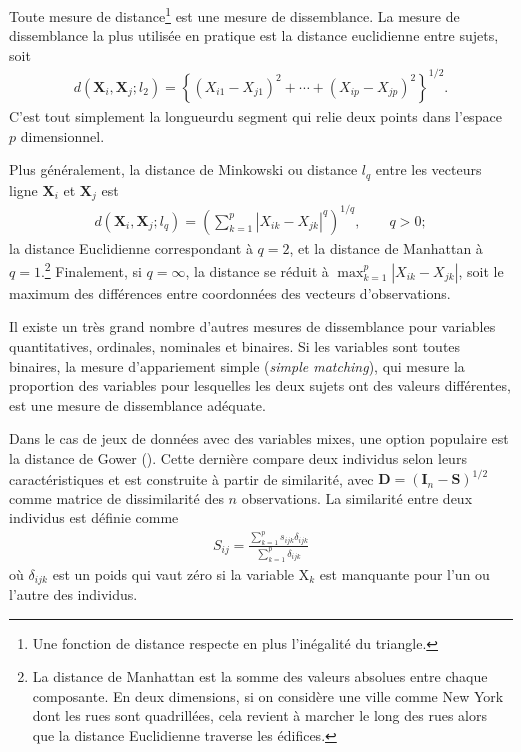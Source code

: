 \documentclass[
  11pt,
  letterpaper,
]{scrbook}
\theoremstyle{definition}
\theoremstyle{remark}
\begin{document}
Toute mesure de distance\footnote{Une fonction de distance respecte en
  plus l'inégalité du triangle.} est une mesure de dissemblance. La
mesure de dissemblance la plus utilisée en pratique est la distance
euclidienne entre sujets, soit \begin{align*}
d(\mathbf{X}_i, \mathbf{X}_j; l_2) = \left\{(X_{i1}-X_{j1})^2 + \cdots + (X_{ip}-X_{jp})^2\right\}^{1/2}.
\end{align*} C'est tout simplement la longueurdu segment qui relie deux
points dans l'espace \(p\) dimensionnel.

Plus généralement, la distance de Minkowski ou distance \(l_q\) entre
les vecteurs ligne \(\mathbf{X}_i\) et \(\mathbf{X}_j\) est
\begin{align*}
d(\mathbf{X}_i, \mathbf{X}_j; l_q) = \left( \sum_{k=1}^p |X_{ik}-X_{jk}|^q \right)^{1/q},\qquad q > 0;
\end{align*} la distance Euclidienne correspondant à \(q=2\), et la
distance de Manhattan à \(q=1\).\footnote{La distance de Manhattan est
  la somme des valeurs absolues entre chaque composante. En deux
  dimensions, si on considère une ville comme New York dont les rues
  sont quadrillées, cela revient à marcher le long des rues alors que la
  distance Euclidienne traverse les édifices.} Finalement, si
\(q=\infty\), la distance se réduit à \(\max_{k=1}^p |X_{ik}-X_{jk}|\),
soit le maximum des différences entre coordonnées des vecteurs
d'observations.

Il existe un très grand nombre d'autres mesures de dissemblance pour
variables quantitatives, ordinales, nominales et binaires. Si les
variables sont toutes binaires, la mesure d'appariement simple
(\emph{simple matching}), qui mesure la proportion des variables pour
lesquelles les deux sujets ont des valeurs différentes, est une mesure
de dissemblance adéquate.

Dans le cas de jeux de données avec des variables mixes, une option
populaire est la distance de Gower (). Cette dernière compare deux individus selon leurs
caractéristiques et est construite à partir de similarité, avec
\(\mathbf{D} = (\mathbf{I}_n-\mathbf{S})^{1/2}\) comme matrice de
dissimilarité des \(n\) observations. La similarité entre deux individus
est définie comme \begin{align*}
S_{ij} = \frac{\sum_{k=1}^p s_{ijk} \delta_{ijk}}{\sum_{k=1}^p \delta_{ijk}}
\end{align*} où \(\delta_{ijk}\) est un poids qui vaut zéro si la
variable \(\mathrm{X}_k\) est manquante pour l'un ou l'autre des
individus.
\end{document}
